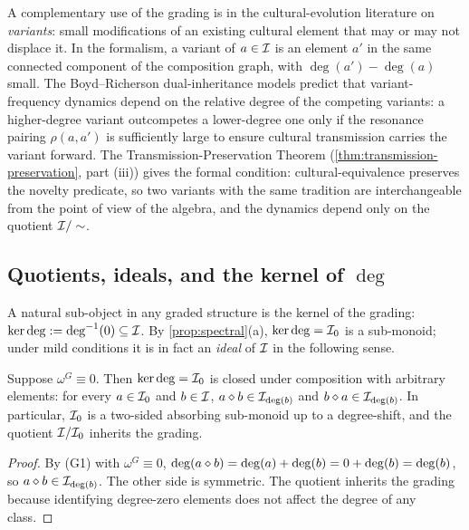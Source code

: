 A complementary use of the grading is in the cultural-evolution
literature on \emph{variants}: small modifications of an existing
cultural element that may or may not displace it. In the formalism, a
variant of $a\in\mathcal{I}$ is an element $a'$ in the same connected
component of the composition graph, with $\deg(a') - \deg(a)$ small.
The Boyd--Richerson dual-inheritance models predict that
variant-frequency dynamics depend on the relative degree of the
competing variants: a higher-degree variant outcompetes a lower-degree
one only if the resonance pairing $\rho(a,a')$ is sufficiently large
to ensure cultural transmission carries the variant forward. The
Transmission-Preservation Theorem
(\cref{thm:transmission-preservation}, part (iii)) gives the formal
condition: cultural-equivalence preserves the novelty predicate, so
two variants with the same tradition are interchangeable from the
point of view of the algebra, and the dynamics depend only on the
quotient $\mathcal{I} / \sim$.

\subsection*{Quotients, ideals, and the kernel of $\deg$}

A natural sub-object in any graded structure is the kernel of the
grading: $\ker\deg \mathrel{:=} \deg^{-1}(0)\subseteq \mathcal{I}$. By
\cref{prop:spectral}(a), $\ker\deg = \mathcal{I}_0$ is a sub-monoid; under
mild conditions it is in fact an \emph{ideal} of $\mathcal{I}$ in the
following sense.

\begin{proposition}\label{prop:kernel-ideal}
Suppose $\omega^G \equiv 0$. Then $\ker\deg = \mathcal{I}_0$ is closed
under composition with arbitrary elements: for every $a\in\mathcal{I}_0$
and $b\in\mathcal{I}$, $a\mathbin{\diamond} b\in\mathcal{I}_{\deg(b)}$ and $b\mathbin{\diamond}
a\in\mathcal{I}_{\deg(b)}$. In particular, $\mathcal{I}_0$ is a two-sided
absorbing sub-monoid up to a degree-shift, and the quotient
$\mathcal{I} / \mathcal{I}_0$ inherits the grading.
\end{proposition}

\begin{proof}
By (G1) with $\omega^G \equiv 0$, $\deg(a\mathbin{\diamond} b) = \deg(a) +
\deg(b) = 0 + \deg(b) = \deg(b)$, so $a\mathbin{\diamond} b\in\mathcal{I}_{\deg(b)}$.
The other side is symmetric. The quotient inherits the grading because
identifying degree-zero elements does not affect the degree of any
class.
\end{proof}


